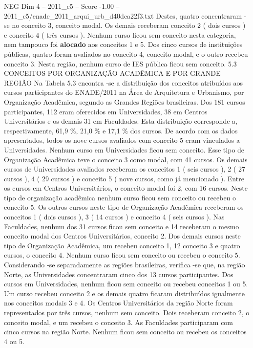 \begin{textsample}{NEG Dim 4 – 2011\_c5 – Score -1.00 – 2011\_c5/enade\_2011\_arqui\_urb\_d40dca22f3.txt}
Destes, quatro concentraram -se no conceito 3, conceito modal.
Os demais receberam conceito 2 ( dois cursos ) e conceito 4 ( três cursos ).
Nenhum curso ficou sem conceito nesta categoria, nem tampouco foi \textbf{alocado} aos conceitos 1 e 5.
Dos cinco cursos de instituições públicas, quatro foram avaliados no conceito 4, conceito modal, e o outro recebeu conceito 3.
Nesta região, nenhum curso de IES pública ficou sem conceito. 5.3 CONCEITOS POR ORGANIZAÇÃO ACADÊMICA E POR GRANDE REGIÃO Na Tabela 5.3 encontra -se a distribuição dos conceitos atribuídos aos cursos participantes do ENADE/2011 na Área de Arquitetura e Urbanismo, por Organização Acadêmica, segundo as Grandes Regiões brasileiras.
Dos 181 cursos participantes, 112 eram oferecidos em Universidades, 38 em Centros Universitários e os demais 31 em Faculdades.
Esta distribuição corresponde a, respectivamente, 61,9 \%, 21,0 \% e 17,1 \% dos cursos.
De acordo com os dados apresentados, todos os nove cursos avaliados com conceito 5 eram vinculados a Universidades.
Nenhum curso em Universidades ficou sem conceito.
Esse tipo de Organização Acadêmica teve o conceito 3 como modal, com 41 cursos.
Os demais cursos de Universidades avaliados receberam os conceitos 1 ( seis cursos ), 2 ( 27 cursos ), 4 ( 29 cursos ) e conceito 5 ( nove cursos, como já mencionado ).
Entre os cursos em Centros Universitários, o conceito modal foi 2, com 16 cursos.
Neste tipo de organização acadêmica nenhum curso ficou sem conceito ou recebeu o conceito 5.
Os outros cursos neste tipo de Organização Acadêmica receberam os conceitos 1 ( dois cursos ), 3 ( 14 cursos ) e conceito 4 ( seis cursos ).
Nas Faculdades, nenhum dos 31 cursos ficou sem conceito e 14 receberam o mesmo conceito modal dos Centros Universitários, conceito 2.
Dos demais cursos neste tipo de Organização Acadêmica, um recebeu conceito 1, 12 conceito 3 e quatro cursos, o conceito 4.
Nenhum curso ficou sem conceito ou recebeu o conceito 5.
Considerando -se separadamente as regiões brasileiras, verifica -se que, na região Norte, as Universidades concentraram cinco dos 13 cursos participantes.
Dos cursos em Universidades, nenhum ficou sem conceito ou recebeu conceitos 1 ou 5.
Um curso recebeu conceito 2 e os demais quatro ficaram distribuídos igualmente nos conceitos modais 3 e 4.
Os Centros Universitários da região Norte foram representados por três cursos, nenhum sem conceito.
Dois receberam conceito 2, o conceito modal, e um recebeu o conceito 3.
As Faculdades participaram com cinco cursos na região Norte.
Nenhum ficou sem conceito ou recebeu os conceitos 4 ou 5.

\end{textsample}
